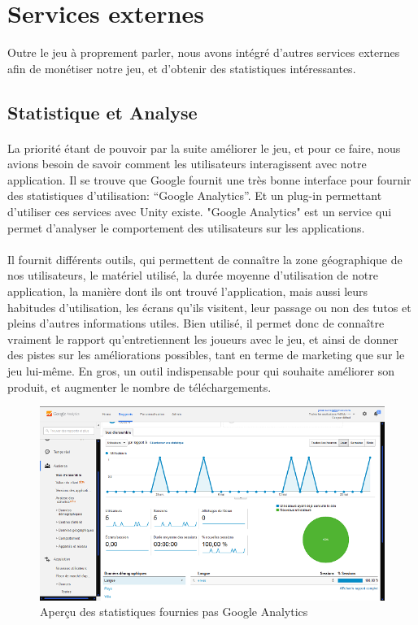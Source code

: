 \section{Services externes}
Outre le jeu à proprement parler, nous avons intégré d'autres services externes afin de monétiser notre jeu, et d'obtenir des statistiques intéressantes.

\subsection{Statistique et Analyse}

\paragraph{}
La priorité étant de pouvoir par la suite améliorer le jeu, et pour ce faire, nous avions besoin de savoir comment les utilisateurs interagissent avec notre application. Il se trouve que Google fournit une très bonne interface pour fournir des statistiques d'utilisation: “Google Analytics”. Et un plug-in permettant d'utiliser ces services avec Unity existe. "Google Analytics" est un service qui permet d'analyser le comportement des utilisateurs sur les applications. 

\paragraph{}Il fournit différents outils, qui permettent de connaître la zone géographique de nos utilisateurs, le matériel utilisé, la durée moyenne d'utilisation de notre application, la manière dont ils ont trouvé l'application, mais aussi leurs habitudes d'utilisation, les écrans qu'ils visitent, leur passage ou non des tutos et pleins d'autres informations utiles. Bien utilisé, il permet donc de connaître vraiment le rapport qu'entretiennent les joueurs avec le jeu, et ainsi de donner des pistes sur les améliorations possibles, tant en terme de marketing que sur le jeu lui-même. En gros, un outil indispensable pour qui souhaite améliorer son produit, et augmenter le nombre de téléchargements.

\begin{figure}[H]\centering
  \includegraphics[scale=0.7]{./img/GoogleAnalytics.png}
  \caption{Aperçu des statistiques fournies pas Google Analytics}
  \label{analytics}
\end{figure}

